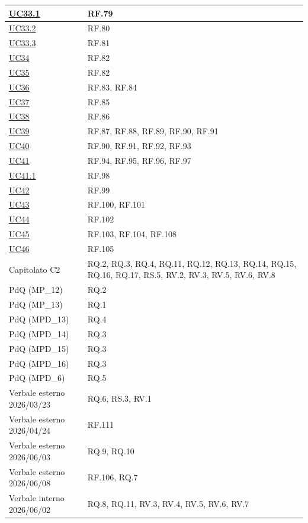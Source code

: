 \documentclass[12pt, a4paper]{article}
\begin{document}
\begin{longtable}{|l|p{}|}
\hyperref[uc:33.1]{UC33.1} & RF.79 \\ \hline
\hyperref[uc:33.2]{UC33.2} & RF.80 \\ \hline
\hyperref[uc:33.3]{UC33.3} & RF.81 \\ \hline
\hyperref[uc:34]{UC34} & RF.82 \\ \hline
\hyperref[uc:35]{UC35} & RF.82 \\ \hline
\hyperref[uc:36]{UC36} & RF.83, RF.84 \\ \hline
\hyperref[uc:37]{UC37} & RF.85 \\ \hline
\hyperref[uc:38]{UC38} & RF.86 \\ \hline
\hyperref[uc:39]{UC39} & RF.87, RF.88, RF.89, RF.90, RF.91 \\ \hline
\hyperref[uc:40]{UC40} & RF.90, RF.91, RF.92, RF.93 \\ \hline
\hyperref[uc:41]{UC41} & RF.94, RF.95, RF.96, RF.97 \\ \hline
\hyperref[uc:41.1]{UC41.1} & RF.98 \\ \hline
\hyperref[uc:42]{UC42} & RF.99 \\ \hline
\hyperref[uc:43]{UC43} & RF.100, RF.101 \\ \hline
\hyperref[uc:44]{UC44} & RF.102 \\ \hline
\hyperref[uc:45]{UC45} & RF.103, RF.104, RF.108 \\ \hline
\hyperref[uc:46]{UC46} & RF.105 \\ \hline
Capitolato C2 & RQ.2, RQ.3, RQ.4, RQ.11, RQ.12, RQ.13, RQ.14, RQ.15, RQ.16, RQ.17, RS.5, RV.2, RV.3, RV.5, RV.6, RV.8 \\ \hline
PdQ (MP\_12) & RQ.2 \\ \hline
PdQ (MP\_13) & RQ.1 \\ \hline
PdQ (MPD\_13) & RQ.4 \\ \hline
PdQ (MPD\_14) & RQ.3 \\ \hline
PdQ (MPD\_15) & RQ.3 \\ \hline
PdQ (MPD\_16) & RQ.3 \\ \hline
PdQ (MPD\_6) & RQ.5 \\ \hline

Verbale esterno 2026/03/23 & RQ.6, RS.3, RV.1 \\ \hline
Verbale esterno 2026/04/24 & RF.111 \\ \hline
Verbale esterno 2026/06/03 & RQ.9, RQ.10 \\ \hline
Verbale esterno 2026/06/08 & RF.106, RQ.7 \\ \hline
Verbale interno 2026/06/02 & RQ.8, RQ.11, RV.3, RV.4, RV.5, RV.6, RV.7 \\ \hline

\end{longtable}
\end{document}
